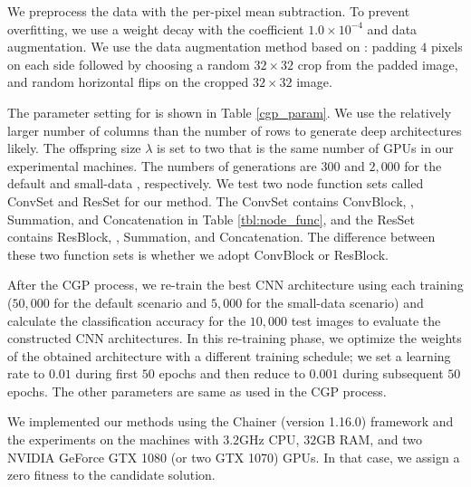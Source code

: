 We preprocess the data with the per-pixel mean subtraction.
To prevent overfitting, we use a weight decay with the coefficient $1.0 \times 10^{-4}$ and data augmentation.
We use the data augmentation method based on \cite{he_deep_2016}: padding $4$ pixels on each side followed by choosing a random $32\times 32$ crop from the padded image, and random horizontal flips on the cropped $32 \times 32$ image.

The parameter setting for  is shown in Table \ref{cgp_param}. We use the relatively larger number of columns than the number of rows to generate deep architectures  likely.
The offspring size  $\lambda$ is set to two\new{;} that is the same number of GPUs in our experimental machines.
The numbers of generations are $300$ and $2,000$ for the default and small-data , respectively. 
We test two node function sets called ConvSet and ResSet for our method.
The ConvSet contains ConvBlock,  , Summation, and Concatenation in Table \ref{tbl:node_func}, and the ResSet contains ResBlock,  , Summation, and Concatenation.
The difference between these two function sets is whether we adopt ConvBlock or ResBlock.

After the CGP process, we re-train the best CNN architecture using each training  ($50,000$ for the default scenario and $5,000$ for the small-data scenario)\new{,} and  calculate the classification accuracy for the $10,000$ test images to evaluate the constructed CNN architectures.
In this re-training phase, we optimize the weights of the obtained architecture with a different training schedule; we set a learning rate to $0.01$ during  first $50$ epochs and then reduce  to $0.001$ during  subsequent $50$ epochs. The other parameters are  same as  used in the CGP process.

We  implemented our methods using the Chainer \cite{tokui_chainer:_2015} (version 1.16.0) framework and  the experiments on the machines with $3.2$GHz CPU, $32$GB RAM, and two NVIDIA GeForce GTX 1080 (or two GTX 1070) GPUs.
In that case, we assign a zero fitness to the candidate solution.

